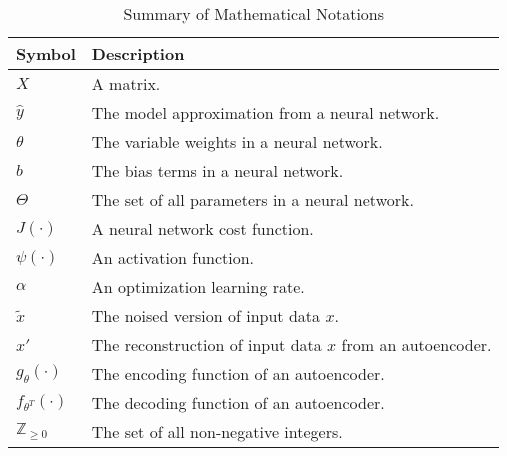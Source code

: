 \begin{table}[ht]
\caption{Summary of Mathematical Notations} %
\centering %
\begin{tabular}{l l} %
\hline %
Symbol & Description \\ %
\hline %
$X$ & A matrix. \\ %
$\hat{y}$ & The model approximation from a neural network.  \\
$\theta$ & The variable weights in a neural network.  \\
$b$ & The bias terms in a neural network. \\  %
$\Theta$ & The set of all parameters in a neural network.  \\
$J(\cdot)$ & A neural network cost function. \\
$\psi(\cdot)$ & An activation function. \\
$\alpha$ & An optimization learning rate. \\
$\tilde{x}$ & The noised version of input data $x$.  \\
$x'$ & The reconstruction of input data $x$ from an autoencoder.  \\
$g_{\theta}(\cdot)$ & The encoding function of an autoencoder.  \\
$f_{\theta^{T}}(\cdot)$ & The decoding function of an autoencoder. \\ 
$\mathbb{Z}_{\geq 0}$ & The set of all non-negative integers. \\ [1ex]
\hline %
\end{tabular}
\label{table:notation}
\end{table}
